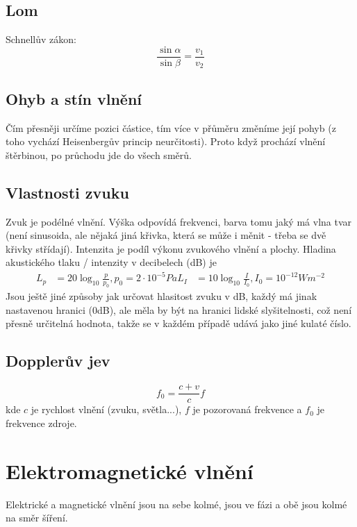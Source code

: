 \documentclass[titlepage]{report}
\begin{document}
\section{Lom}
Schnellův zákon:
\begin{equation}
\frac{\sin \alpha}{\sin \beta} = \frac{v_1}{v_2}
\end{equation}
\section{Ohyb a stín vlnění}
Čím přesněji určíme pozici částice, tím více v přůměru změníme její pohyb (z toho vychází Heisenbergův princip neurčitosti). Proto když prochází vlnění štěrbinou, po průchodu jde do všech směrů.
\section{Vlastnosti zvuku}
Zvuk je podélné vlnění. Výška odpovídá frekvenci, barva tomu jaký má vlna tvar (není sinusoida, ale nějaká jiná křivka, která se může i měnit - třeba se dvě křivky střídají). Intenzita je podíl výkonu zvukového vlnění a plochy. Hladina akustického tlaku / intenzity v decibelech (dB) je\\
\begin{align}
L_p &= 20 \log_{10}\frac{p}{p_0}, p_0 = 2 \cdot 10^{-5} Pa
L_I &= 10 \log_{10}\frac{I}{I_0}, I_0 = 10^{-12} Wm^{-2}
\end{align}
Jsou ještě jiné způsoby jak určovat hlasitost zvuku v dB, každý má jinak nastavenou hranici (0dB), ale měla by být na hranici lidské slyšitelnosti, což není přesně určitelná hodnota, takže se v každém případě udává jako jiné kulaté číslo.
\section{Dopplerův jev}
\begin{equation}
f_0 = \frac{c + v}{c} f
\end{equation}
kde $c$ je rychlost vlnění (zvuku, světla...), $f$ je pozorovaná frekvence a $f_0$ je frekvence zdroje.
\chapter{Elektromagnetické vlnění}
Elektrické a magnetické vlnění jsou na sebe kolmé, jsou ve fázi a obě jsou kolmé na směr šíření.
\end{document}

